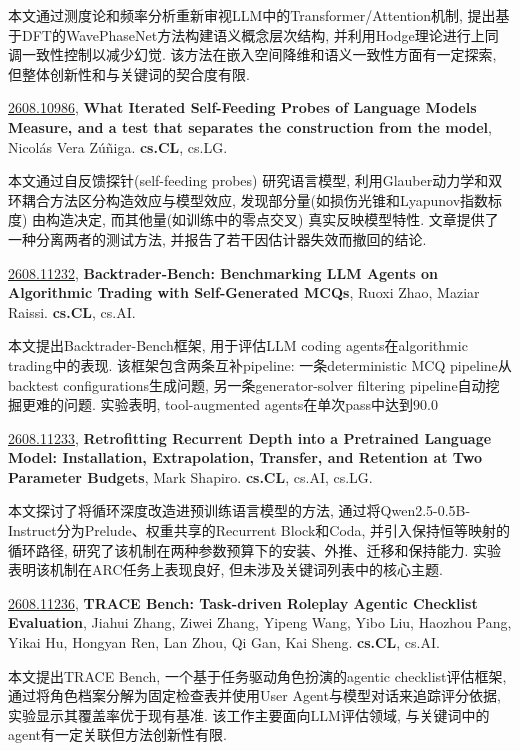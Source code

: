 \documentclass[9pt, a4paper]{article}
\theoremstyle{plain}
\theoremstyle{definition}
\theoremstyle{remark}
\newcommand{\arxivwithtarget}[3]{\hypertarget{#1}{}\href{https://arxiv.org/abs/#1}{#1}, \textbf{\textcolor{arxivblue}{#2}}, #3. }
\begin{document}
本文通过测度论和频率分析重新审视LLM中的Transformer/Attention机制, 提出基于DFT的WavePhaseNet方法构建语义概念层次结构, 并利用Hodge理论进行上同调一致性控制以减少幻觉. 该方法在嵌入空间降维和语义一致性方面有一定探索, 但整体创新性和与关键词的契合度有限.


\arxivwithtarget{2608.10986}{What Iterated Self-Feeding Probes of Language Models Measure, and a test that separates the construction from the model}{Nicolás Vera Zúñiga}\textbf{cs.CL}, cs.LG.

本文通过自反馈探针(self-feeding probes) 研究语言模型, 利用Glauber动力学和双环耦合方法区分构造效应与模型效应, 发现部分量(如损伤光锥和Lyapunov指数标度) 由构造决定, 而其他量(如训练中的零点交叉) 真实反映模型特性. 文章提供了一种分离两者的测试方法, 并报告了若干因估计器失效而撤回的结论.


\arxivwithtarget{2608.11232}{Backtrader-Bench: Benchmarking LLM Agents on Algorithmic Trading with Self-Generated MCQs}{Ruoxi Zhao, Maziar Raissi}\textbf{cs.CL}, cs.AI.

本文提出Backtrader-Bench框架, 用于评估LLM coding agents在algorithmic trading中的表现. 该框架包含两条互补pipeline: 一条deterministic MCQ pipeline从backtest configurations生成问题, 另一条generator-solver filtering pipeline自动挖掘更难的问题. 实验表明, tool-augmented agents在单次pass中达到90.0%


\arxivwithtarget{2608.11233}{Retrofitting Recurrent Depth into a Pretrained Language Model: Installation, Extrapolation, Transfer, and Retention at Two Parameter Budgets}{Mark Shapiro}\textbf{cs.CL}, cs.AI, cs.LG.

本文探讨了将循环深度改造进预训练语言模型的方法, 通过将Qwen2.5-0.5B-Instruct分为Prelude、权重共享的Recurrent Block和Coda, 并引入保持恒等映射的循环路径, 研究了该机制在两种参数预算下的安装、外推、迁移和保持能力. 实验表明该机制在ARC任务上表现良好, 但未涉及关键词列表中的核心主题.


\arxivwithtarget{2608.11236}{TRACE Bench: Task-driven Roleplay Agentic Checklist Evaluation}{Jiahui Zhang, Ziwei Zhang, Yipeng Wang, Yibo Liu, Haozhou Pang, Yikai Hu, Hongyan Ren, Lan Zhou, Qi Gan, Kai Sheng}\textbf{cs.CL}, cs.AI.

本文提出TRACE Bench, 一个基于任务驱动角色扮演的agentic checklist评估框架, 通过将角色档案分解为固定检查表并使用User Agent与模型对话来追踪评分依据, 实验显示其覆盖率优于现有基准. 该工作主要面向LLM评估领域, 与关键词中的agent有一定关联但方法创新性有限.
\end{document}
